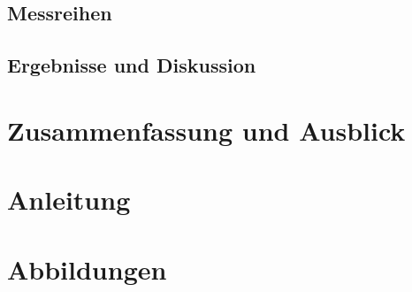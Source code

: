 \documentclass[
    11pt, %
    DIV=11,
    ngerman, %
    a4paper, %
    twoside, %
    titlepage, %
    parskip=half, %
    headings=normal, %
    listof=totoc, %
    bibliography=totoc, %
    index=totoc, %
    captions=tableheading, %
    final %
]{scrreprt}
\begin{document}
	\section{Messreihen}
		
	\section{Ergebnisse und Diskussion}
		

\chapter{Zusammenfassung und Ausblick}
	

\renewcommand{\refname}{Literatur- und Webverzeichnis}
\RaggedRight


\begin{appendix}
    \chapter{Anleitung}
    \label{sec:Anhang}
    \setdefaultleftmargin{1em}{}{}{}{}{}
    
    \chapter{Abbildungen}
    \setdefaultleftmargin{1em}{}{}{}{}{}
    
\end{appendix}

\end{document}
